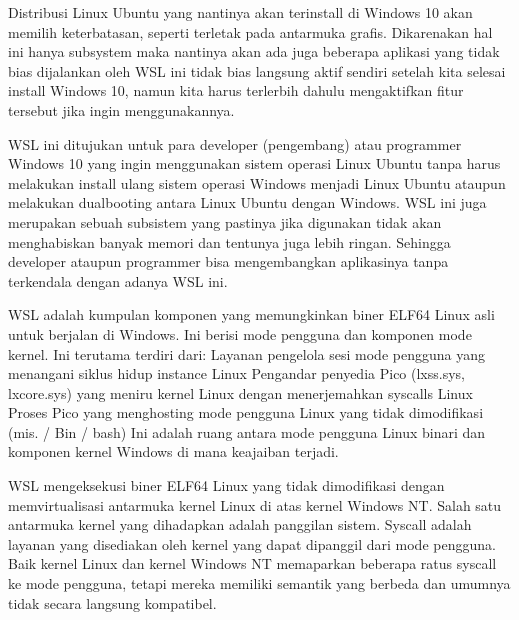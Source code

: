 \begin{enumeratae}
Distribusi Linux Ubuntu yang nantinya akan terinstall di Windows 10 akan memilih keterbatasan, seperti terletak pada antarmuka grafis. Dikarenakan hal ini hanya subsystem maka nantinya akan ada juga beberapa aplikasi yang tidak bias dijalankan oleh WSL ini tidak bias langsung aktif sendiri setelah kita selesai install Windows 10, namun kita harus terlerbih dahulu mengaktifkan fitur tersebut jika ingin menggunakannya.

WSL ini ditujukan untuk para developer (pengembang) atau programmer Windows 10 yang ingin menggunakan sistem operasi Linux Ubuntu tanpa harus melakukan install ulang sistem operasi Windows menjadi Linux Ubuntu ataupun melakukan dualbooting antara Linux Ubuntu dengan Windows. WSL ini juga merupakan sebuah subsistem yang pastinya jika digunakan tidak akan menghabiskan banyak memori dan tentunya juga lebih ringan. Sehingga developer ataupun programmer bisa mengembangkan aplikasinya tanpa terkendala dengan adanya WSL ini.

WSL adalah kumpulan komponen yang memungkinkan biner ELF64 Linux asli untuk berjalan di Windows. Ini berisi mode pengguna dan komponen mode kernel. Ini terutama terdiri dari:
Layanan pengelola sesi mode pengguna yang menangani siklus hidup instance Linux
Pengandar penyedia Pico (lxss.sys, lxcore.sys) yang meniru kernel Linux dengan menerjemahkan syscalls Linux
Proses Pico yang menghosting mode pengguna Linux yang tidak dimodifikasi (mis. / Bin / bash)
Ini adalah ruang antara mode pengguna Linux binari dan komponen kernel Windows di mana keajaiban terjadi.

WSL mengeksekusi biner ELF64 Linux yang tidak dimodifikasi dengan memvirtualisasi antarmuka kernel Linux di atas kernel Windows NT. Salah satu antarmuka kernel yang dihadapkan adalah panggilan sistem. Syscall adalah layanan yang disediakan oleh kernel yang dapat dipanggil dari mode pengguna. Baik kernel Linux dan kernel Windows NT memaparkan beberapa ratus syscall ke mode pengguna, tetapi mereka memiliki semantik yang berbeda dan umumnya tidak secara langsung kompatibel.


\end{enumeratae}

